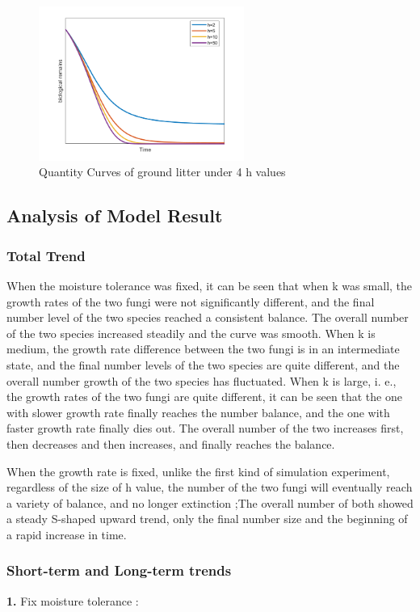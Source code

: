 \documentclass{mcmthesis}
\begin{document}
\begin{figure}[H]
	\centering
	\includegraphics[width=0.6\textwidth]{img/不同h的分解曲线.png}
	\caption{Quantity Curves of ground litter under 4 h values}\label{fig:不同h的分解曲线}
\end{figure}
\subsection{Analysis of Model Result}
\subsubsection{Total Trend}
When the moisture tolerance was fixed, it can be seen that when k was small, the growth rates of the two fungi were not significantly different, and the final number level of the two species reached a consistent balance. The overall number of the two species increased steadily and the curve was smooth. When k is medium, the growth rate difference between the two fungi is in an intermediate state, and the final number levels of the two species are quite different, and the overall number growth of the two species has fluctuated. When k is large, i. e., the growth rates of the two fungi are quite different, it can be seen that the one with slower growth rate finally reaches the number balance, and the one with faster growth rate finally dies out. The overall number of the two increases first, then decreases and then increases, and finally reaches the balance.       

When the growth rate is fixed, unlike the first kind of simulation experiment, regardless of the size of h value, the number of the two fungi will eventually reach a variety of balance, and no longer extinction ;The overall number of both showed a steady S-shaped upward trend, only the final number size and the beginning of a rapid increase in time.
\subsubsection{Short-term and Long-term trends}
\textbf{1.} Fix moisture tolerance :       
\end{document}
